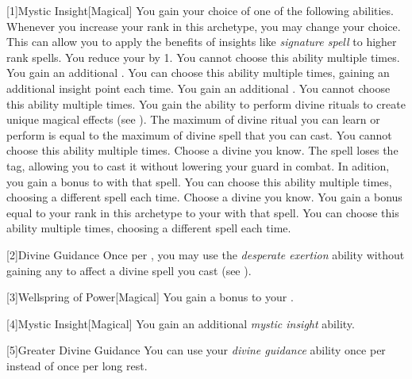         [1]{Mystic Insight}[Magical]
        You gain your choice of one of the following abilities.
        Whenever you increase your rank in this archetype, you may change your choice.
        This can allow you to apply the benefits of insights like \textit{signature spell} to higher rank spells.
        {
             You reduce your  by 1.
                You cannot choose this ability multiple times.
             You gain an additional .
                You can choose this ability multiple times, gaining an additional insight point each time.
             You gain an additional .
                You cannot choose this ability multiple times.
             You gain the ability to perform divine rituals to create unique magical effects (see ).
                The maximum  of divine ritual you can learn or perform is equal to the maximum  of divine spell that you can cast.
                You cannot choose this ability multiple times.
             Choose a divine  you know.
                The spell loses the  tag, allowing you to cast it without lowering your guard in combat.
                In adition, you gain a  bonus to  with that spell.
                You can choose this ability multiple times, choosing a different spell each time.
             Choose a divine  you know.
                You gain a bonus equal to your rank in this archetype to your  with that spell.
                You can choose this ability multiple times, choosing a different spell each time.
        }

        [2]{Divine Guidance} Once per , you may use the \textit{desperate exertion} ability without gaining any  to affect a divine spell you cast (see ).

        [3]{Wellspring of Power}[Magical]
        You gain a  bonus to your  .

        [4]{Mystic Insight}[Magical]
        You gain an additional \textit{mystic insight} ability.

        [5]{Greater Divine Guidance} You can use your \textit{divine guidance} ability once per  instead of once per long rest.

